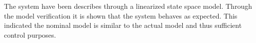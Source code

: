 

The system have been describes through a linearized state space model. 
Through the model verification it is shown that the system behaves as expected. 
This indicated the nominal model is similar to the actual model and thus sufficient control purposes. 




